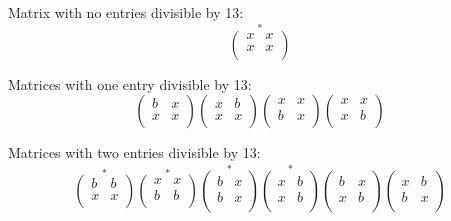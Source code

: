 \documentclass[12pt]{article}
\begin{document}
Matrix with no entries divisible by 13:
\[
\stackrel{*}
{
\left(\begin{matrix}
x & x \\
x & x \\
\end{matrix}\right)
}
\]

Matrices with one entry divisible by 13:
\[
\left(\begin{matrix}
b & x \\
x & x \\
\end{matrix}\right)
\left(\begin{matrix}
x & b \\
x & x \\
\end{matrix}\right)
\left(\begin{matrix}
x & x \\
b & x \\
\end{matrix}\right)
\left(\begin{matrix}
x & x \\
x & b \\
\end{matrix}\right)
\]

Matrices with two entries divisible by 13:
\[
\stackrel{*}
{
\left(\begin{matrix}
b & b \\
x & x \\
\end{matrix}\right)
}
\stackrel{*}
{
\left(\begin{matrix}
x & x \\
b & b \\
\end{matrix}\right)
}
\stackrel{*}
{
\left(\begin{matrix}
b & x \\
b & x \\
\end{matrix}\right)
}
\stackrel{*}
{
\left(\begin{matrix}
x & b \\
x & b \\
\end{matrix}\right)
}
\left(\begin{matrix}
b & x \\
x & b \\
\end{matrix}\right)
\left(\begin{matrix}
x & b \\
b & x \\
\end{matrix}\right)
\]
\end{document}
